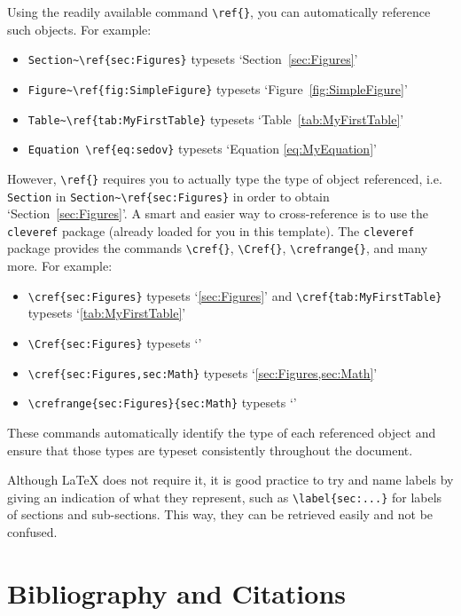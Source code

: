 \documentclass[11pt,twoside,openright]{report}
\begin{document}
Using the readily available command \verb|\ref{}|, you can automatically reference such objects. For example:
\begin{itemize}
    \item \verb|Section~\ref{sec:Figures}| typesets `Section~\ref{sec:Figures}'
    \item \verb|Figure~\ref{fig:SimpleFigure}| typesets `Figure~\ref{fig:SimpleFigure}'
    \item \verb|Table~\ref{tab:MyFirstTable}| typesets `Table~\ref{tab:MyFirstTable}'
    \item \verb|Equation \ref{eq:sedov}| typesets `Equation \ref{eq:MyEquation}'
\end{itemize}

However, \verb|\ref{}| requires you to actually type the type of object referenced, i.e.  \verb|Section| in \verb|Section~\ref{sec:Figures}| in order to obtain `Section~\ref{sec:Figures}'. 
A smart and easier way to cross-reference is to use the \verb|cleveref| package (already loaded for you in this template).
The \verb|cleveref| package provides the commands \verb|\cref{}|, \verb|\Cref{}|, \verb|\crefrange{}|, and many more. For example:
\begin{itemize}
    \item \verb|\cref{sec:Figures}| typesets `\cref{sec:Figures}' and \verb|\cref{tab:MyFirstTable}| typesets `\cref{tab:MyFirstTable}'
    \item \verb|\Cref{sec:Figures}| typesets `'
    \item \verb|\cref{sec:Figures,sec:Math}| typesets `\cref{sec:Figures,sec:Math}'
    \item \verb|\crefrange{sec:Figures}{sec:Math}| typesets `'
\end{itemize}
%
These commands automatically identify the type of each referenced object and ensure that those types are typeset consistently throughout the document.

Although \LaTeX{} does not require it, it is good practice to try and name labels by giving an indication of what they represent, such as \verb|\label{sec:...}| for labels of sections and sub-sections.
This way, they can be retrieved easily and not be confused.




\section{Bibliography and Citations}
\label{sec:Bibligraphy}
\end{document}
